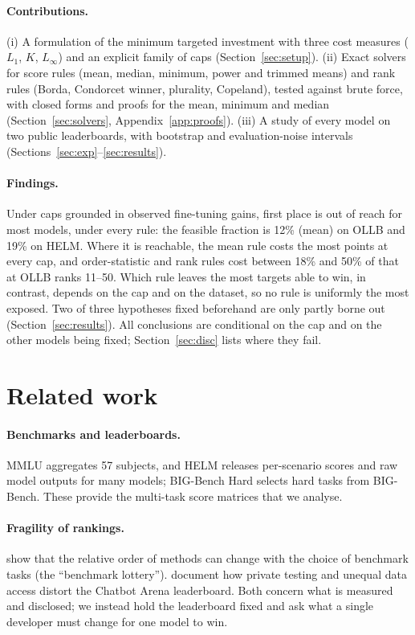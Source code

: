 \documentclass{article}
\begin{document}
\paragraph{Contributions.}
(i) A formulation of the minimum targeted investment with three cost measures ($L_1$, $K$, $L_\infty$) and an explicit family of caps (Section~\ref{sec:setup}). (ii) Exact solvers for score rules (mean, median, minimum, power and trimmed means) and rank rules (Borda, Condorcet winner, plurality, Copeland), tested against brute force, with closed forms and proofs for the mean, minimum and median (Section~\ref{sec:solvers}, Appendix~\ref{app:proofs}). (iii) A study of every model on two public leaderboards, with bootstrap and evaluation-noise intervals (Sections~\ref{sec:exp}--\ref{sec:results}).

\paragraph{Findings.}
Under caps grounded in observed fine-tuning gains, first place is out of reach for most models, under every rule: the feasible fraction is 12\% (mean) on OLLB and 19\% on HELM. Where it is reachable, the mean rule costs the most points at every cap, and order-statistic and rank rules cost between 18\% and 50\% of that at OLLB ranks 11--50. Which rule leaves the most targets able to win, in contrast, depends on the cap and on the dataset, so no rule is uniformly the most exposed. Two of three hypotheses fixed beforehand are only partly borne out (Section~\ref{sec:results}). All conclusions are conditional on the cap and on the other models being fixed; Section~\ref{sec:disc} lists where they fail.

\section{Related work}
\label{sec:related}
\paragraph{Benchmarks and leaderboards.}
MMLU \citep{hendrycks2021mmlu} aggregates 57 subjects, and HELM \citep{liang2023helm} releases per-scenario scores and raw model outputs for many models; BIG-Bench Hard \citep{suzgun2023bbh} selects hard tasks from BIG-Bench. These provide the multi-task score matrices that we analyse.

\paragraph{Fragility of rankings.}
\citet{dehghani2021lottery} show that the relative order of methods can change with the choice of benchmark tasks (the ``benchmark lottery''). \citet{singh2025illusion} document how private testing and unequal data access distort the Chatbot Arena leaderboard. Both concern what is measured and disclosed; we instead hold the leaderboard fixed and ask what a single developer must change for one model to win.
\end{document}
